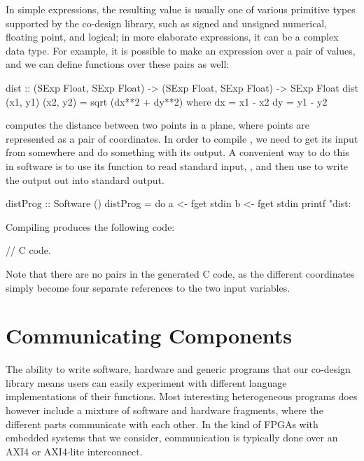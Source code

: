 \documentclass[../main.tex]{subfiles}
\begin{document}
In simple expressions, the resulting value is usually one of various primitive types supported by the co-design library, such as signed and unsigned numerical, floating point, and logical; in more elaborate expressions, it can be a complex data type. For example, it is possible to make an expression over a pair of values, and we can define functions over these pairs as well:

\begin{code}
dist :: (SExp Float, SExp Float) -> (SExp Float, SExp Float) -> SExp Float
dist (x1, y1) (x2, y2) = sqrt (dx**2 + dy**2)
  where
    dx = x1 - x2
    dy = y1 - y2
\end{code}

\noindent {} computes the distance between two points in a plane, where points are represented as a pair of coordinates. In order to compile , we need to get its input from somewhere and do something with its output. A convenient way to do this in software is to use its  function to read standard input, , and then use  to write the output out into standard output.

\begin{code}
distProg :: Software ()
distProg = do
  a <- fget stdin
  b <- fget stdin
  printf "dist: %
\end{code}

Compiling  produces the following code:

\begin{code}
// C code.
\end{code}

\noindent Note that there are no pairs in the generated C code, as the different coordinates simply become four separate references to the two input variables.

\section{Communicating Components}

The ability to write software, hardware and generic programs that our co-design library means users can easily experiment with different language implementations of their functions. Most interesting heterogeneous programs does however include a mixture of software and hardware fragments, where the different parts communicate with each other. In the kind of FPGAs with embedded systems that we consider, communication is typically done over an AXI4 or AXI4-lite interconnect. 
\end{document}
